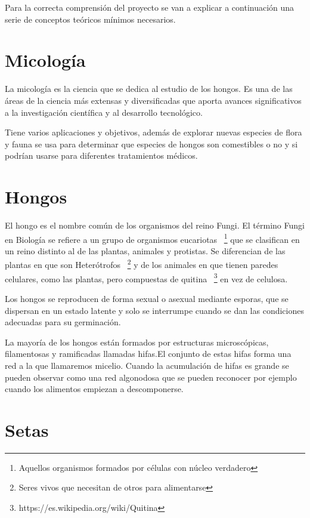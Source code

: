 
Para la correcta comprensión del proyecto se van a explicar a continuación una serie de conceptos teóricos mínimos necesarios.

\section{Micología}

La micología es la ciencia que se dedica al estudio de los hongos. Es una de las áreas de la ciencia más extensas y diversificadas que aporta avances significativos a la investigación científica y al desarrollo tecnológico. ~\cite{wiki:micologia}

Tiene varios aplicaciones y objetivos, además de explorar nuevas especies de flora y fauna se usa para determinar que especies de hongos son comestibles o no y si podrían usarse para diferentes tratamientos médicos.

\section{Hongos}

El hongo es el nombre común de los organismos del reino Fungi. El término Fungi en Biología se refiere a un grupo de organismos eucariotas ~\footnote{Aquellos organismos formados por células con núcleo verdadero} que se clasifican en un reino distinto al de las plantas, animales y protistas. Se diferencian de las plantas en que son Heterótrofos ~\footnote{Seres vivos que necesitan de otros para alimentarse} y de los animales en que tienen paredes celulares, como las plantas, pero compuestas de quitina ~\footnote{https://es.wikipedia.org/wiki/Quitina} en vez de celulosa.

Los hongos se reproducen de forma sexual o asexual mediante esporas, que se dispersan en un estado latente y solo se interrumpe cuando se dan las condiciones adecuadas para su germinación. ~\cite{wiki:fungi}

La mayoría de los hongos están formados por estructuras microscópicas, filamentosas y ramificadas llamadas hifas.El conjunto de estas hifas forma una red a la que llamaremos micelio. Cuando la acumulación de hifas es grande se pueden observar como una red algonodosa que se pueden reconocer por ejemplo cuando los alimentos empiezan a descomponerse. ~\cite{setas}

\section{Setas}

